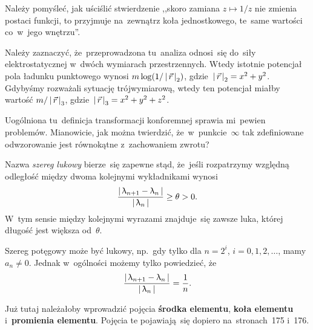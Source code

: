 \documentclass[a4paper,11pt]{article}
\begin{document}
\start {} Należy pomyśleć, jak uściślić stwierdzenie ,,skoro
zamiana $z \mapsto 1 / z$ nie zmienia postaci funkcji, to przyjmuje
na~zewnątrz koła jednostkowego, te~same wartości co~w~jego wnętrzu''.

\vspace{\spaceFour}


\start {} Należy zaznaczyć, że~przeprowadzona tu~analiza
odnosi~się do~siły elektrostatycznej w~dwóch wymiarach przestrzennych.
Wtedy istotnie potencjał pola ładunku punktowego wynosi
$m \log(1 / \left| \,  \vec{ r }  \, \right|_{ 2 } )$,
gdzie~$\left| \,  \vec{ r }  \, \right|_{ 2 } = x^{ 2 } + y^{ 2 }$. Gdybyśmy rozważali
sytuację trójwymiarową, wtedy ten potencjał miałby wartość
$m / \left| \,  \vec{ r }  \, \right|_{ 3 }$,
gdzie~$\left| \,  \vec{ r }  \, \right|_{ 3 } = x^{ 2 } + y^{ 2 } + z^{ 2 }$.

\vspace{\spaceFour}


\start {} Uogólniona tu~definicja transformacji konforemnej
sprawia mi~pewien problemów. Mianowicie, jak można twierdzić,
że~w~punkcie~$\infty$ tak zdefiniowane odwzorowanie jest równokątne
z~zachowaniem zwrotu?

\vspace{\spaceFour}


\start {} Nazwa \emph{szereg lukowy} bierze~się zapewne stąd,
że~jeśli rozpatrzymy względną odległość między dwoma kolejnymi
wykładnikami wynosi
\begin{equation}
  \label{eq:Leja-45}
  \frac{ \left| \,  \uplambda_{ n + 1 } - \uplambda_{ n }  \, \right| }{ \left| \,  \uplambda_{ n }  \, \right| }
  \geq \theta > 0.
\end{equation}
W~tym sensie między kolejnymi wyrazami znajduje~się zawsze luka,
której długość jest większa od~$\theta$.

Szereg potęgowy może być lukowy, np.~gdy tylko dla $n = 2^{ i }$,
$i = 0, 1, 2, \ldots$, mamy $a_{ n } \neq 0$. Jednak w~ogólności
możemy tylko powiedzieć, że
\begin{equation}
  \label{eq:Leja-46}
  \frac{ \left| \,  \uplambda_{ n + 1 } - \uplambda_{ n }  \, \right| }{ \left| \,  \uplambda_{ n }  \, \right| }
  = \frac{ 1 }{ n }.
\end{equation}

\vspace{\spaceFour}


\start {} Już tutaj należałoby wprowadzić pojęcia
\textbf{środka elementu}, \textbf{koła elementu} i~\textbf{promienia
  elementu}. Pojęcia te pojawiają~się dopiero na~stronach~175 i~176.

\vspace{\spaceFour}
\end{document}
